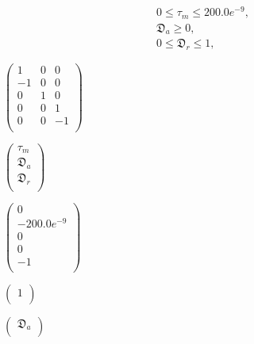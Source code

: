 \documentclass[a4paper,11pt,twoside,openright]{book}
\def\lthtmlcheckvsize{\ifdim\ht\sizebox<\vsize 
  \ifdim\wd\sizebox<\hsize\expandafter\hfill\fi \expandafter\vfill
  \else\expandafter\vss\fi}%
\begin{document}
{\newpage\clearpage
\setcounter{equation}{27}
%
\begin{subequations}\begin{gather}
0 \leqslant \tau_m \leqslant 200.0e^{-9}, \\
\mathfrak{D}_a \geqslant 0, \\
0 \leqslant \mathfrak{D}_r \leqslant 1,
\end{gather}\end{subequations}%
\lthtmldisplayZ
\lthtmlcheckvsize\clearpage}

{\newpage\clearpage
{}%
$\displaystyle \begin{pmatrix}
1 &  0 &  0 \\
-1 &  0 &  0 \\
0 &  1 &  0 \\
0 &  0 &  1 \\
0 &  0 & -1 \\
\end{pmatrix}$%
\lthtmlindisplaymathZ
\lthtmlcheckvsize\clearpage}

{\newpage\clearpage
{}%
$\displaystyle \begin{pmatrix}
\tau_m \\
\mathfrak{D}_a \\
\mathfrak{D}_r \\
\end{pmatrix}$%
\lthtmlindisplaymathZ
\lthtmlcheckvsize\clearpage}

{\newpage\clearpage
{}%
$\displaystyle \begin{pmatrix}
0 \\
-200.0e^{-9} \\
0 \\
0 \\
-1 \\
\end{pmatrix}$%
\lthtmlindisplaymathZ
\lthtmlcheckvsize\clearpage}

{\newpage\clearpage
{}%
$\displaystyle \begin{pmatrix}
1 \\
\end{pmatrix}$%
\lthtmlindisplaymathZ
\lthtmlcheckvsize\clearpage}

{\newpage\clearpage
{}%
$\displaystyle \begin{pmatrix}
\mathfrak{D}_a \\
\end{pmatrix}$%
\lthtmlindisplaymathZ
\lthtmlcheckvsize\clearpage}
\end{document}
